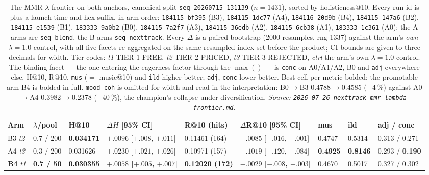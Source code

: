 \documentclass[11pt]{article}
\newcommand{\runid}[1]{\texttt{\small\seqsplit{#1}}}
\newcommand{\dsid}[1]{\texttt{\small #1}}
\newcommand{\best}[1]{\textbf{#1}}
\begin{document}
\begin{table}[ht]
  \centering
  \caption{The MMR $\lambda$ frontier on both anchors, canonical split
  \dsid{seq-20260715-131139} ($n=\num{1431}$), sorted by holisticness@10. Every
  run id is \protect\runid{run-20260726-} plus a launch time and hex suffix, in
  arm order: \texttt{184115-bf395} (B3), \texttt{184115-1dc77} (A4),
  \texttt{184116-20d9b} (B4), \texttt{184115-147a6} (B2),
  \texttt{184115-e1539} (B1), \texttt{183333-9a0b2} (B0),
  \texttt{184115-7a2f7} (A3), \texttt{184115-36edb} (A2),
  \texttt{184115-6cb38} (A1), \texttt{183333-1c361} (A0); the A arms are
  \texttt{seq-blend}, the B arms \texttt{seq-nexttrack}. Every $\Delta$ is a
  paired bootstrap (\num{2000} resamples, rng \num{1337}) against the arm's
  \emph{own} $\lambda=\num{1.0}$ control, with all five facets re-aggregated on
  the same resampled index set before the product; CI bounds are given to three
  decimals for width. Tier codes: \emph{t1} TIER-1 FREE, \emph{t2} TIER-2 PRICED,
  \emph{t3} TIER-3 REJECTED, \emph{ctrl} the arm's own $\lambda=\num{1.0}$
  control. The binding facet --- the one entering the eagerness factor through the
  $\max()$ --- is \texttt{conc} on A0/A1/A2, B0 and \texttt{adj} everywhere else.
  H@10, R@10, \texttt{mus} ($=$ music@10) and \texttt{ild}
  higher-better; \texttt{adj}, \texttt{conc} lower-better. Best cell per metric
  bolded; the promotable arm B4 is bolded in full. \texttt{mood\_coh} is omitted
  for width and read in the interpretation: B0$\to$B3 \num{0.4788}$\to$\num{0.4585}
  ($-\SI{4}{\percent}$) against A0$\to$A4 \num{0.3982}$\to$\num{0.2378}
  ($-\SI{40}{\percent}$), the champion's collapse under diversification.
  \emph{Source: \texttt{2026-07-26-nexttrack-mmr-lambda-frontier.md}.}}
  \label{tab:nexttrack-mmr-arms}
  {\scriptsize\setlength{\tabcolsep}{1.9pt}\begin{tabular}{lllllllll}
    \toprule
    Arm & $\lambda$/pool & H@10 & $\Delta H$ [95\% CI] & R@10 (hits) & $\Delta$R@10 [95\% CI] & mus & ild & adj / conc \\
    \midrule
    B3 \emph{t2} & 0.7 / 200 & \best{0.034171} & $+.0096$ [$+.008$, $+.011$] & 0.11461 (164) & $-.0085$ [$-.016$, $-.001$] & 0.4747 & 0.5314 & 0.313 / 0.271 \\
    A4 \emph{t3} & 0.3 / 200 & 0.031626 & $+.0230$ [$+.021$, $+.026$] & 0.10971 (157) & $-.1019$ [$-.120$, $-.084$] & \best{0.4925} & \best{0.8146} & 0.293 / \best{0.190} \\
    \best{B4} \emph{t1} & \best{0.7 / 50} & \best{0.030355} & \best{$+.0058$ [$+.005$, $+.007$]} & \best{0.12020 (172)} & \best{$-.0029$ [$-.008$, $+.003$]} & 0.4670 & 0.5017 & 0.327 / 0.302 \\

\end{tabular}}
\end{table}
\end{document}
